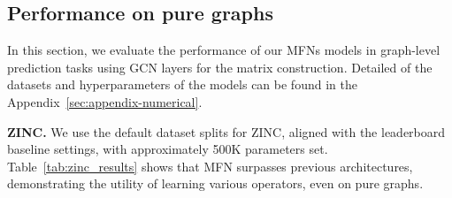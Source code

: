 \documentclass{article} \usepackage{iclr2024_conference,times}
\begin{document}
\subsection{Performance on pure graphs}
\label{sec:sec-pure-graph}
\vspace{-5pt}
In this section, we evaluate the performance of our MFNs models in graph-level prediction tasks using GCN layers for the matrix construction. Detailed of the datasets and hyperparameters of the models can be found in the Appendix~\ref{sec:appendix-numerical}.  


\textbf{ZINC.}
We use the default dataset splits for ZINC, aligned with the leaderboard baseline settings, with approximately 500K parameters set. Table~\ref{tab:zinc_results} shows that MFN surpasses previous architectures, demonstrating the utility of learning various operators, even on pure graphs.
\begin{table}[h!t]
\centering
\caption{Results on ZINC with the MAE and number of parameters used, where the best results are in bold. Baselines are taken from~\citep{yang2023better} and model citations are in~\ref{sec:baseline-zinc}.}
\label{tab:zinc_results}
\vspace{-10pt}
\end{table}
\end{document}
